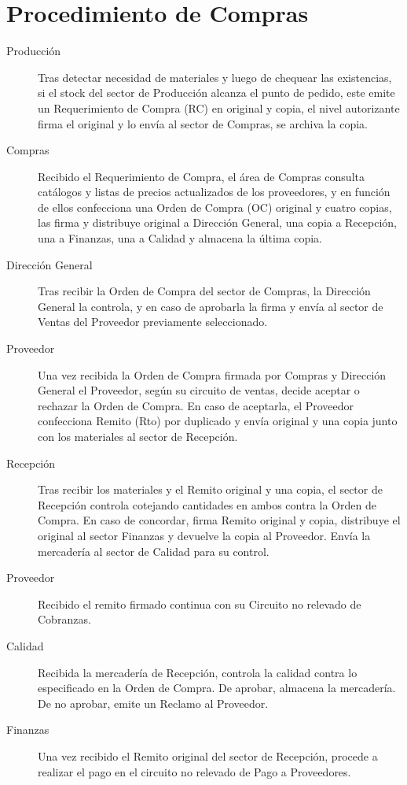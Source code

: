 \section{Procedimiento de Compras}
\begin{description}
\item[Producción] Tras detectar necesidad de materiales y luego de chequear las existencias, si el stock del sector de Producción alcanza el punto de pedido, este emite un Requerimiento de Compra (RC) en original y copia, el nivel autorizante firma el original y lo envía al sector de Compras, se archiva la copia.
\item[Compras] Recibido el Requerimiento de Compra, el área de Compras consulta catálogos y listas de precios actualizados de los proveedores, y en función de ellos confecciona una Orden de Compra (OC) original y cuatro copias, las firma y distribuye original a Dirección General, una copia a Recepción, una a Finanzas, una a Calidad y almacena la última copia.
\item [Dirección General] Tras recibir la Orden de Compra del sector de Compras, la Dirección General la controla, y en caso de aprobarla la firma y envía al sector de Ventas del Proveedor previamente seleccionado.
\item [Proveedor] Una vez recibida la Orden de Compra firmada por Compras y Dirección General el Proveedor, según su circuito de ventas,  decide aceptar o rechazar la Orden de Compra. En caso de aceptarla, el Proveedor confecciona Remito (Rto) por duplicado y envía original y una copia junto con los materiales al sector de Recepción.
\item[Recepción] Tras recibir los materiales y el Remito original y una copia, el sector de Recepción controla cotejando cantidades en ambos contra la Orden de Compra. En caso de concordar, firma Remito original y copia, distribuye el original al sector Finanzas y devuelve la copia al Proveedor. Envía la mercadería al sector de Calidad para su control.
\item [Proveedor] Recibido el remito firmado continua con su Circuito no relevado de Cobranzas.
\item [Calidad] Recibida la mercadería de Recepción, controla la calidad contra lo especificado en la Orden de Compra. De aprobar, almacena la mercadería. De no aprobar, emite un Reclamo al Proveedor.
\item [Finanzas] Una vez recibido el Remito original del sector de Recepción, procede a realizar el pago en el circuito no relevado de Pago a Proveedores.

\end{description}


